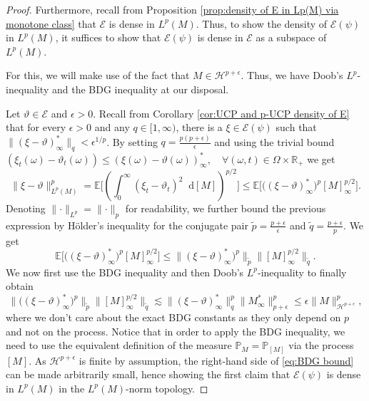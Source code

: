 \documentclass[11pt,a4paper,twoside,openany]{report}
\numberwithin{equation}{section}
\newcommand{\diff}{\mathop{}\!\mathrm{d}}
\theoremstyle{plain} %
\theoremstyle{definition} %
\theoremstyle{remark} %
\begin{document}
\begin{proof}
    Furthermore, recall from Proposition \ref{prop:density of E in Lp(M) via monotone class} that \(\mathcal{E}\) is dense in \(L^p(M)\). Thus, to show the density of \(\mathcal{E}(\psi)\) in \(L^p(M)\), it suffices to show that \(\mathcal{E}(\psi)\) is dense in \(\mathcal{E}\) as a subspace of \(L^p(M)\).

    
     For this, we will make use of the fact that \(M\in\mathcal{H}^{p+\epsilon}\). Thus, we have Doob's \(L^p\)-inequality and the BDG inequality at our disposal.
 
 
   Let \(\vartheta\in\mathcal{E}\) and  \(\epsilon>0\).
    Recall from Corollary \ref{cor:UCP and p-UCP density of E} that for every \(\epsilon>0\) and any \(q\in[1,\infty)\), there is a \(\xi\in\mathcal{E}(\psi)\) such that \(\lVert (\xi-\vartheta)^*_{\infty}\rVert_{q}<\epsilon^{1/p}\). By setting \(q=\frac{p(p+\epsilon)}{\epsilon}\) and using the trivial bound \((\xi_t(\omega)-\vartheta_t(\omega))\leq(\xi(\omega)-\vartheta(\omega))_{\infty}^*,\quad\forall(\omega,t)\in\Omega\times\mathbb{R}_+\) we get
    \begin{equation*}
        \lVert \xi-\vartheta\lVert_{L^p(M)}^p=\mathbb{E}\bigg[\left(\int_{0}^{\infty}(\xi_t-\vartheta_t)^2\diff[M]\right)^{p/2}\bigg]\leq\mathbb{E}\big[\big((\xi-\vartheta)_{\infty}^*\big)^p[M]_{\infty}^{p/2}\big].
    \end{equation*}
    Denoting \(\lVert\cdot\rVert_{L^p}=\lVert\cdot\rVert_{p}\) for readability, we further bound the previous expression by Hölder's inequality for the conjugate pair \(\tilde{p}=\frac{p+\epsilon}{\epsilon}\) and \(\tilde{q}=\frac{p+\epsilon}{p}\). We get
    \begin{equation*}
        \mathbb{E}\big[\big((\xi-\vartheta)
        _{\infty}^*\big)^p[M]_{\infty}^{p/2}\big]\leq\big\lVert(\xi-\vartheta)_{\infty}^*)^p\big\rVert_{\tilde{p}}\big\lVert[M]_{\infty}^{p/2} \big\rVert_{\tilde{q}}.
    \end{equation*}
    We now first use the BDG inequality and then Doob's \(L^p\)-inequality to finally obtain
    \begin{equation}\label{eq:BDG bound}
        \big\lVert\big((\xi-\vartheta)_{\infty}^*\big)^p\big\rVert_{\tilde{p}}\big\lVert[M]_{\infty}^{p/2} \big\rVert_{\tilde{q}}\lesssim \big\lVert(\xi-\vartheta)_{\infty}^*\big\rVert_{q}^p\big\lVert M^*_{\infty}\big\rVert_{p+\epsilon}^p\leq\epsilon\big\lVert M\big\rVert_{\mathcal{H}^{p+\epsilon}}^p,
    \end{equation}
    where we don't care about the exact BDG constants as they only depend on \(p\) and not on the process. Notice that in order to apply the BDG inequality, we need to use the equivalent definition of the measure \(\mathbb{P}_M=\mathbb{P}_{[M]}\) via the process \([M]\).
    As \(\mathcal{H}^{p+\epsilon}\) is finite by assumption, the right-hand side of \eqref{eq:BDG bound} can be made arbitrarily small, hence showing the first claim that \(\mathcal{E}(\psi)\) is dense in \(L^p(M)\) in the \(L^p(M)\)-norm topology.


\end{proof}
\end{document}
